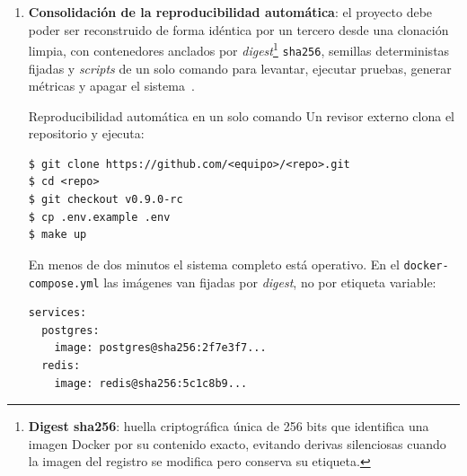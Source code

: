 \documentclass[11pt,a4paper]{article}
\begin{document}
\begin{enumerate}
    \begin{cajaejemplo}{Consolidaci\'{o}n de un requisito}
        Un requisito funcional t\'{i}pico de un sistema de gesti\'{o}n de pedidos podr\'{i}a redactarse as\'{i} (patr\'{o}n \emph{[condici\'{o}n] [sujeto] shall [acci\'{o}n] [objeto] [restricci\'{o}n]} de ISO/IEC/IEEE 29148):

        \begin{lstlisting}[basicstyle=\ttfamily\scriptsize]
Id:              REQ-F-014
Tipo:            Funcional
Prioridad:       Must (MoSCoW)
Enunciado:       Al recibir una solicitud de anulacion, el sistema
                 debera cambiar el estado del pedido a ANULADO en un
                 plazo maximo de 2 segundos.
Rationale:       El cliente pierde la confianza si la anulacion
                 tarda mas de 2s (evidencia: entrevista E-03).
Verificacion:    Test JUnit integrationTest_anularPedido_p95_2000ms
Trazabilidad:    -> Historia HU-08 -> Caso de uso CU-05 ->
                 -> Endpoint POST /api/pedidos/{id}/anular ->
                 -> Test PedidoTest.anular_p95 -> Evidencia perf/run-03.json
Estado:          verificado
        \end{lstlisting}
    \end{cajaejemplo}

    \item \textbf{Consolidaci\'{o}n de la reproducibilidad autom\'{a}tica}: el proyecto debe poder ser reconstruido de forma id\'{e}ntica por un tercero desde una clonaci\'{o}n limpia, con contenedores anclados por \emph{digest}\footnote{\textbf{Digest sha256}: huella criptogr\'{a}fica \'{u}nica de 256 bits que identifica una imagen Docker por su contenido exacto, evitando derivas silenciosas cuando la imagen del registro se modifica pero conserva su etiqueta.} \texttt{sha256}, semillas deterministas fijadas y \emph{scripts} de un solo comando para levantar, ejecutar pruebas, generar m\'{e}tricas y apagar el sistema~\cite{wilkinson2016fair,acm2020artifact}.

    \begin{cajaejemplo}{Reproducibilidad autom\'{a}tica en un solo comando}
        Un revisor externo clona el repositorio y ejecuta:
        \begin{lstlisting}[basicstyle=\ttfamily\scriptsize]
$ git clone https://github.com/<equipo>/<repo>.git
$ cd <repo>
$ git checkout v0.9.0-rc
$ cp .env.example .env
$ make up
        \end{lstlisting}

        En menos de dos minutos el sistema completo est\'{a} operativo. En el \texttt{docker-compose.yml} las im\'{a}genes van fijadas por \emph{digest}, no por etiqueta variable:
        \begin{lstlisting}[basicstyle=\ttfamily\scriptsize]
services:
  postgres:
    image: postgres@sha256:2f7e3f7...
  redis:
    image: redis@sha256:5c1c8b9...
        \end{lstlisting}
    \end{cajaejemplo}


\end{enumerate}
\end{document}
